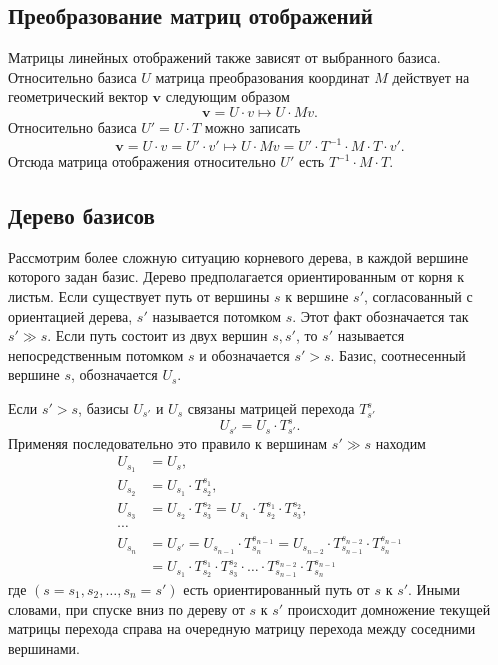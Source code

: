 \documentclass[a4paper]{article}
\begin{document}
\subsection{Преобразование матриц отображений}

Матрицы линейных отображений также зависят от выбранного базиса. Относительно базиса $U$ матрица преобразования координат $M$ действует на геометрический вектор $\mathbf v$ следующим образом
$$
\mathbf v = U \cdot v \mapsto U \cdot M v.
$$
Относительно базиса $U' = U \cdot T$ можно записать
$$
\mathbf v = U \cdot v = U' \cdot v' \mapsto U \cdot M v = U' \cdot T^{-1} \cdot M \cdot T \cdot v'.
$$
Отсюда матрица отображения относительно $U'$ есть $T^{-1} \cdot M \cdot T$.


\subsection{Дерево базисов}

Рассмотрим более сложную ситуацию корневого дерева, в каждой вершине которого задан базис. Дерево предполагается ориентированным от корня к листьм. Если существует путь от вершины $s$ к вершине $s'$, согласованный с ориентацией дерева, $s'$ называется потомком  $s$. Этот факт обозначается так $s' \gg s$. Если путь состоит из двух вершин $s, s'$, то $s'$ называется непосредственным потомком $s$ и обозначается $s' > s$. Базис, соотнесенный вершине $s$, обозначается $U_s$.

Если $s' > s$, базисы $U_{s'}$ и $U_s$ связаны матрицей перехода $T^s_{s'}$
$$
U_{s'} = U_s \cdot T^s_{s'}.
$$
Применяя последовательно это правило к вершинам $s' \gg s$ находим
\begin{align*}
U_{s_1} &= U_s, \\
U_{s_2} &= U_{s_1} \cdot T^{s_1}_{s_2}, \\
U_{s_3} &= U_{s_2} \cdot T^{s_2}_{s_3} = U_{s_1} \cdot T^{s_1}_{s_2} \cdot T^{s_2}_{s_3} , \\
\cdots \\
U_{s_n} &= U_{s'} = U_{s_{n-1}} \cdot T^{s_{n-1}}_{s_n} = U_{s_{n-2}} \cdot T^{s_{n-2}}_{s_{n-1}} \cdot T^{s_{n-1}}_{s_n} \\
&= U_{s_1} \cdot  T^{s_1}_{s_2} \cdot T^{s_2}_{s_3} \cdot \ldots \cdot T^{s_{n-2}}_{s_{n-1}} \cdot T^{s_{n-1}}_{s_n}
\end{align*}
где $(s = s_1, s_2, \ldots, s_n = s')$ есть ориентированный путь от $s$ к $s'$. Иными словами, при спуске вниз по дереву от $s$ к $s'$ происходит домножение текущей матрицы перехода справа на очередную матрицу перехода между соседними вершинами.
\end{document}
